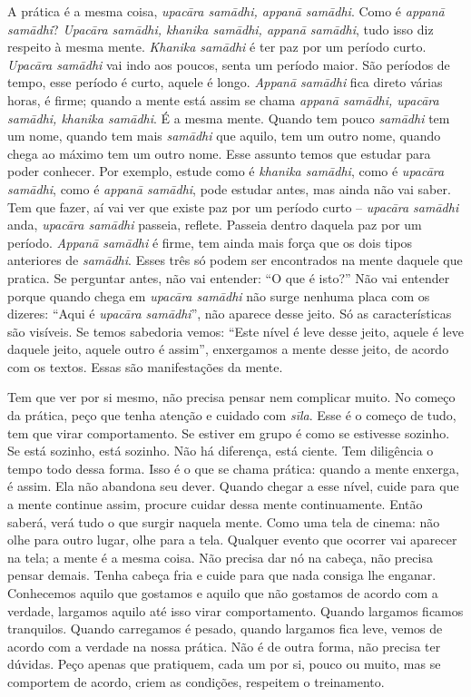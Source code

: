 A prática é a mesma coisa, \textit{upacāra samādhi, appanā
samādhi}. Como é \textit{appanā samādhi}?\textit{ Upacāra
samādhi, khanika samādhi, appanā samādhi}, tudo isso diz
respeito à mesma mente. \textit{Khanika samādhi} é ter paz por um
período curto. \textit{Upacāra samādhi} vai indo aos poucos, senta
um período maior. São períodos de tempo, esse período é curto, aquele é
longo. \textit{Appanā samādhi} fica direto várias horas, é firme;
quando a mente está assim se chama \textit{appanā samādhi,
upacāra samādhi, khanika samādhi}. É a mesma mente. Quando tem
pouco \textit{samādhi} tem um nome, quando tem mais
\textit{samādhi} que aquilo, tem um outro nome, quando chega ao
máximo tem um outro nome. Esse assunto temos que estudar para poder
conhecer. Por exemplo, estude como é \textit{khanika samādhi}, como é
\textit{upacāra samādhi}, como é \textit{appanā samādhi}, pode
estudar antes, mas ainda não vai saber. Tem que fazer, aí vai ver que
existe paz por um período curto – \textit{upacāra samādhi} anda,
\textit{upacāra samādhi} passeia, reflete. Passeia dentro daquela
paz por um período. \textit{Appanā samādhi} é firme, tem ainda mais
força que os dois tipos anteriores de \textit{samādhi}. Esses três só
podem ser encontrados na mente daquele que pratica. Se perguntar antes,
não vai entender: “O que é isto?” Não vai entender porque quando chega
em \textit{upacāra samādhi} não surge nenhuma placa com os dizeres:
“Aqui é \textit{upacāra samādhi}”, não aparece desse jeito. Só as
características são visíveis. Se temos sabedoria vemos: “Este nível é
leve desse jeito, aquele é leve daquele jeito, aquele outro é assim”,
enxergamos a mente desse jeito, de acordo com os textos. Essas são
manifestações da mente. 

Tem que ver por si mesmo, não precisa pensar nem complicar muito. No
começo da prática, peço que tenha atenção e cuidado com
\textit{sīla}. Esse é o começo de tudo, tem que virar comportamento.
Se estiver em grupo é como se estivesse sozinho. Se está sozinho, está
sozinho. Não há diferença, está ciente. Tem diligência o tempo todo
dessa forma. Isso é o que se chama prática: quando a mente enxerga, é
assim. Ela não abandona seu dever. Quando chegar a esse nível, cuide
para que a mente continue assim, procure cuidar dessa mente
continuamente. Então saberá, verá tudo o que surgir naquela mente. Como
uma tela de cinema: não olhe para outro lugar, olhe para a tela.
Qualquer evento que ocorrer vai aparecer na tela; a mente é a mesma
coisa. Não precisa dar nó na cabeça, não precisa pensar demais. Tenha
cabeça fria e cuide para que nada consiga lhe enganar. Conhecemos
aquilo que gostamos e aquilo que não gostamos de acordo com a verdade,
largamos aquilo até isso virar comportamento. Quando largamos ficamos
tranquilos. Quando carregamos é pesado, quando largamos fica leve,
vemos de acordo com a verdade na nossa prática. Não é de outra forma,
não precisa ter dúvidas. Peço apenas que pratiquem, cada um por si,
pouco ou muito, mas se comportem de acordo, criem as condições,
respeitem o treinamento. 

